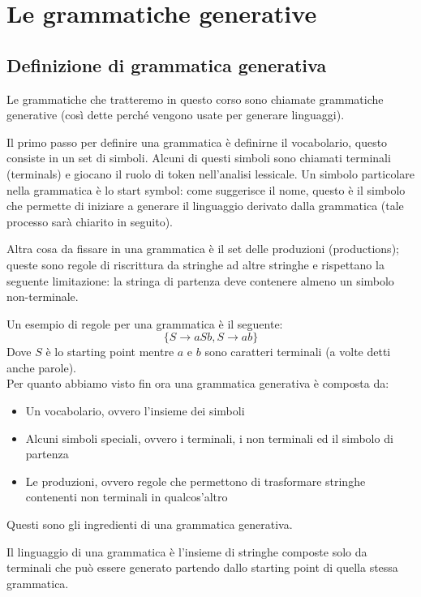 \documentclass[class=book, crop=false, oneside, 12pt]{standalone}
\begin{document}
\chapter{Le grammatiche generative}

\section{Definizione di grammatica generativa}
Le grammatiche che tratteremo in questo corso sono chiamate grammatiche generative (così dette perché vengono usate per generare linguaggi).

Il primo passo per definire una grammatica è definirne il vocabolario, questo consiste in un set di simboli.
Alcuni di questi simboli sono chiamati terminali (terminals) e giocano il ruolo di token nell’analisi lessicale.
Un simbolo particolare nella grammatica è lo start symbol: come suggerisce il nome, questo è il simbolo che permette di iniziare a generare il linguaggio derivato dalla grammatica (tale processo sarà chiarito in seguito).

Altra cosa da fissare in una grammatica è il set delle produzioni (productions); queste sono regole di riscrittura da stringhe ad altre stringhe e rispettano la seguente limitazione: la stringa di partenza deve contenere almeno un simbolo non-terminale.

Un esempio di regole per una grammatica è il seguente:
\begin{equation}
    \{S \to aSb, S \to ab\}
    \label{produzioni_esempio_0}
\end{equation}
Dove \(S\) è lo starting point mentre \(a\) e \(b\) sono caratteri terminali (a volte detti anche parole).\\
Per quanto abbiamo visto fin ora una grammatica generativa è composta da:
	\begin{itemize}
        \item Un vocabolario, ovvero l'insieme dei simboli
        \item Alcuni simboli speciali, ovvero i terminali, i non terminali ed il simbolo di partenza
        \item Le produzioni, ovvero regole che permettono di trasformare stringhe contenenti non terminali in qualcos’altro
    \end{itemize}
Questi sono gli ingredienti di una grammatica generativa.

Il linguaggio di una grammatica è l’insieme di stringhe composte solo da terminali che può essere generato partendo dallo starting point di quella stessa grammatica.
\end{document}
